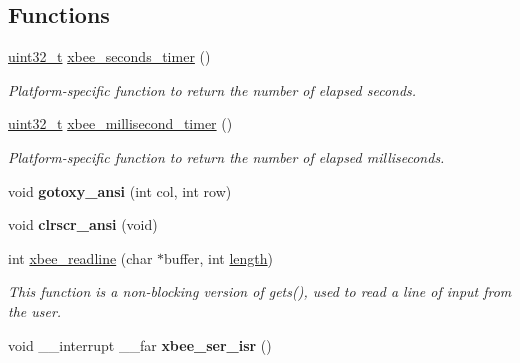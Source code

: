 \subsection*{Functions}
\begin{DoxyCompactItemize}
\item 
\hyperlink{group__hal__dos_ga09a1e304d66d35dd47daffee9731edaa}{uint32\-\_\-t} \hyperlink{group__hal__dos_gad66d00b144089426f04db771be5baa8b}{xbee\-\_\-seconds\-\_\-timer} ()
\begin{DoxyCompactList}\small\item\em Platform-\/specific function to return the number of elapsed seconds. \end{DoxyCompactList}\item 
\hyperlink{group__hal__dos_ga09a1e304d66d35dd47daffee9731edaa}{uint32\-\_\-t} \hyperlink{group__hal__dos_ga63bb246b86f72e88fa8ddc7a429c0e67}{xbee\-\_\-millisecond\-\_\-timer} ()
\begin{DoxyCompactList}\small\item\em Platform-\/specific function to return the number of elapsed milliseconds. \end{DoxyCompactList}\item 
\hypertarget{group__hal__dos_gaf18bb6d8ede135a0bc5c13b7737be755}{void {\bfseries gotoxy\-\_\-ansi} (int col, int row)}\label{group__hal__dos_gaf18bb6d8ede135a0bc5c13b7737be755}

\item 
\hypertarget{group__hal__dos_gacb897f5c3c3f8fc84b84851f496371a6}{void {\bfseries clrscr\-\_\-ansi} (void)}\label{group__hal__dos_gacb897f5c3c3f8fc84b84851f496371a6}

\item 
int \hyperlink{group__hal__dos_ga8c0c80b64f63d395e718172190b21fcc}{xbee\-\_\-readline} (char $\ast$buffer, int \hyperlink{group__zdo_gab2b3adeb2a67e656ff030b56727fd0ac}{length})
\begin{DoxyCompactList}\small\item\em This function is a non-\/blocking version of gets(), used to read a line of input from the user. \end{DoxyCompactList}\item 
\hypertarget{group__hal__dos_ga2d4d704dafd7a589a4305575192fb012}{void \-\_\-\-\_\-interrupt \-\_\-\-\_\-far {\bfseries xbee\-\_\-ser\-\_\-isr} ()}\label{group__hal__dos_ga2d4d704dafd7a589a4305575192fb012}


\end{DoxyCompactItemize}

